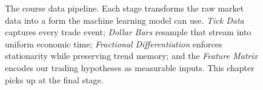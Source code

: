 \begin{figure}[ht]

\caption{%
  The course data pipeline. Each stage transforms the raw market data
  into a form the machine learning model can use.
  \textit{Tick Data} captures every trade event; \textit{Dollar Bars}
  resample that stream into uniform economic time; \textit{Fractional
  Differentiation} enforces stationarity while preserving trend memory;
  and the \textit{Feature Matrix} encodes our trading hypotheses as
  measurable inputs. This chapter picks up at the final stage.%
}
\label{fig:data-pipeline}
\end{figure}